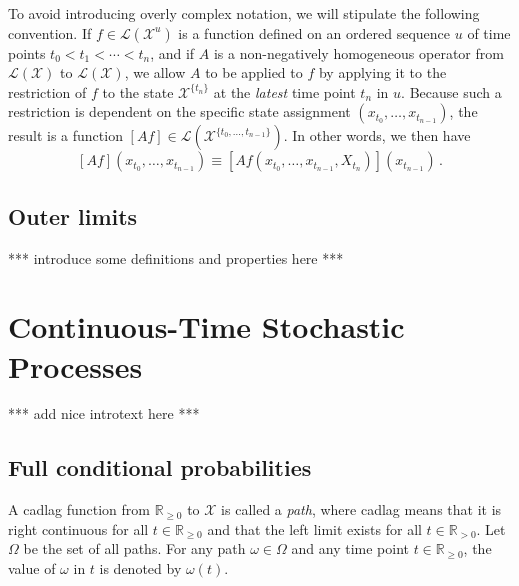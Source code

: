 \documentclass[10pt]{paper}
\theoremstyle{definition}
\newcommand{\reals}{\mathbb{R}}
\newcommand{\realspos}{\reals_{>0}}
\newcommand{\realsnonneg}{\reals_{\geq 0}}
\newcommand{\states}{\mathcal{X}}
\newcommand{\paths}{\Omega}
\newcommand{\path}{\omega}
\newcommand{\gambles}{\mathcal{L}}
\newcommand{\gamblesX}{\gambles(\states)}
\begin{document}
To avoid introducing overly complex notation, we will stipulate the following convention. If $f\in\gambles(\states^u)$ is a function defined on an ordered sequence $u$ of time points $t_0<t_1<\cdots<t_n$, and if $A$ is a non-negatively homogeneous operator from $\gamblesX$ to $\gamblesX$, we allow $A$ to be applied to $f$ by applying it to the restriction of $f$ to the state $\states^{\{t_n\}}$ at the \emph{latest} time point $t_n$ in $u$. Because such a restriction is dependent on the specific state assignment $(x_{t_0},\ldots,x_{t_{n-1}})$, the result is a function $[Af]\in\gambles(\states^{\{t_0,\ldots,t_{n-1}\}})$. In other words, we then have
\begin{equation*}
\left[Af\right](x_{t_0},\ldots,x_{t_{n-1}}) \equiv \left[A f(x_{t_0},\ldots,x_{t_{n-1}},X_{t_n})\right](x_{t_{n-1}})\,.
\end{equation*}

\subsection{Outer limits}

*** introduce some definitions and properties here ***


\section{Continuous-Time Stochastic Processes}

*** add nice introtext here ***

\subsection{Full conditional probabilities}

A cadlag function from $\realsnonneg$ to $\states$ is called a \emph{path}, where cadlag means that it is right continuous for all $t\in\realsnonneg$ and that the left limit exists for all $t\in\realspos$. Let $\paths$ be the set of all paths. For any path $\path\in\paths$ and any time point $t\in\realsnonneg$, the value of $\path$ in $t$ is denoted by $\path(t)$.
\end{document}

